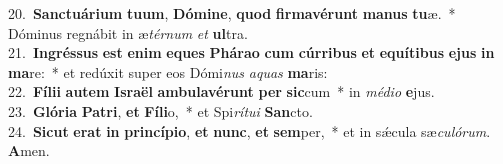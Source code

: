 {20.~}\textbf{San}\textbf{ctu}\textbf{á}\textbf{ri}\textbf{um} \textbf{tu}\textbf{um}, \textbf{Dó}\textbf{mi}\textbf{ne}, \textbf{quod} \textbf{fir}\textbf{ma}\textbf{vé}\textbf{runt} \textbf{ma}\textbf{nus} \textbf{tu}æ.~* Dóminus regnábit in æ\textit{tér}\textit{num} \textit{et} \textbf{ul}tra.\\
{21.~}\textbf{In}\textbf{grés}\textbf{sus} \textbf{est} \textbf{e}\textbf{nim} \textbf{e}\textbf{ques} \textbf{Phá}\textbf{ra}\textbf{o} \textbf{cum} \textbf{cúr}\textbf{ri}\textbf{bus} \textbf{et} \textbf{e}\textbf{quí}\textbf{ti}\textbf{bus} \textbf{e}\textbf{jus} \textbf{in} \textbf{ma}re:~* et redúxit super eos Dómi\textit{nus} \textit{a}\textit{quas} \textbf{ma}ris:\\
{22.~}\textbf{Fí}\textbf{li}\textbf{i} \textbf{au}\textbf{tem} \textbf{Is}\textbf{ra}\textbf{ël} \textbf{am}\textbf{bu}\textbf{la}\textbf{vé}\textbf{runt} \textbf{per} \textbf{sic}cum~* in \textit{mé}\textit{di}\textit{o} \textbf{e}jus.\\
{23.~}\textbf{Gló}\textbf{ri}\textbf{a} \textbf{Pa}\textbf{tri}, \textbf{et} \textbf{Fí}\textbf{li}o,~* et Spi\textit{rí}\textit{tu}\textit{i} \textbf{San}cto.\\
{24.~}\textbf{Si}\textbf{cut} \textbf{e}\textbf{rat} \textbf{in} \textbf{prin}\textbf{cí}\textbf{pi}\textbf{o}, \textbf{et} \textbf{nunc}, \textbf{et} \textbf{sem}per,~* et in sǽcula sæ\textit{cu}\textit{ló}\textit{rum}. \textbf{A}men.\\
